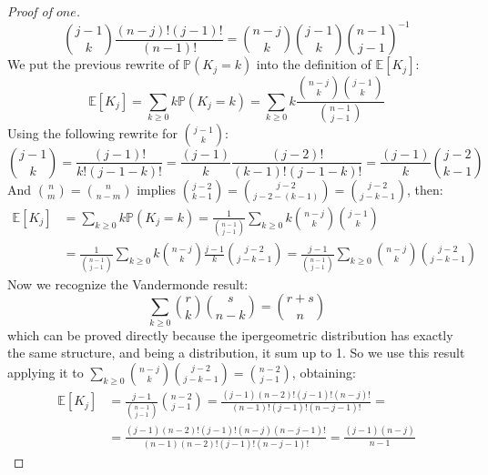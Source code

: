 \begin{proof}[Proof of $one$]
\begin{displaymath}
    {{j-1}\choose{k}} \frac{(n-j)! (j-1)! }{(n-1)!} =  {{n-j}\choose{k}}
    {{j-1}\choose{k}} {{n-1}\choose{j-1}}^{-1}
  \end{displaymath}
  We put the previous rewrite of $\mathbb{P}\left(K_j = k \right)$ into
  the definition of $\mathbb{E} \left[ K_j \right]$:
  \begin{displaymath}
    \mathbb{E} \left[ K_j \right] = \sum_{k \geq 0}{k \mathbb{P}\left(
        K_j = k      \right) }  = \sum_{k \geq 0}{k \frac{{{n-j}\choose{k}}
        {{j-1}\choose{k}}}{{{n-1}\choose{j-1}}}}
  \end{displaymath}
  Using the following rewrite for ${{j-1}\choose{k}}$:
  \begin{displaymath}
    {{j-1}\choose{k}} =  \frac{(j-1)!}{k!(j-1-k)!} =
    \frac{(j-1)}{k} \frac{(j-2)!}{(k-1)!(j-1-k)!} =
    \frac{(j-1)}{k}{{j-2}\choose{k-1}} 
  \end{displaymath}
  And ${{n}\choose{m}} = {{n}\choose{n-m}}$ implies ${{j-2}\choose{k-1}}
  = {{j-2}\choose{j-2 -(k-1)}} = {{j-2}\choose{j -k-1}}$, then:
  \begin{displaymath}
    \begin{split}
      \mathbb{E} \left[ K_j \right] &= \sum_{k \geq 0}{k
        \mathbb{P}\left( K_j = k \right) } =
      \frac{1}{{{n-1}\choose{j-1}}} \sum_{k \geq 0}{k
        {{n-j}\choose{k}} {{j-1}\choose{k}}} \\
      &= \frac{1}{{{n-1}\choose{j-1}}} \sum_{k \geq 0}{k
        {{n-j}\choose{k}}  \frac{j-1}{k}{{j-2}\choose{j-k-1}}}
      = \frac{j-1}{{{n-1}\choose{j-1}}} \sum_{k \geq 0}{
        {{n-j}\choose{k}} {{j-2}\choose{j-k-1}}}
    \end{split}
  \end{displaymath}
  Now we recognize the Vandermonde result:
  \begin{displaymath}
    \sum_{k \geq 0}{{{r}\choose{k}} {{s}\choose{n-k}}  } =
    {{r + s}\choose{n}} 
  \end{displaymath}
  which can be proved directly because the ipergeometric distribution
  has exactly the same structure, and being a distribution, it sum up
  to 1. So we use this result applying it to $\sum_{k \geq 0}{
    {{n-j}\choose{k}} {{j-2}\choose{j-k-1}}} = {{n-2}\choose{j-1}} $,
  obtaining:
  \begin{displaymath}
    \begin{split}
      \mathbb{E} \left[ K_j \right] &= \frac{j-1}{{{n-1}\choose{j-1}}}
      {{n-2}\choose{j-1}} =
      \frac{(j-1)(n-2)!(j-1)!(n-j)!}{(n-1)!(j-1)!(n-j-1)!}=\\
      &=\frac{(j-1)(n-2)!(j-1)!(n-j)(n-j-1)!}
      {(n-1)(n-2)!(j-1)!(n-j-1)!}= \frac{(j-1)(n-j)}{n-1} 
    \end{split}
  \end{displaymath}
\end{proof}
